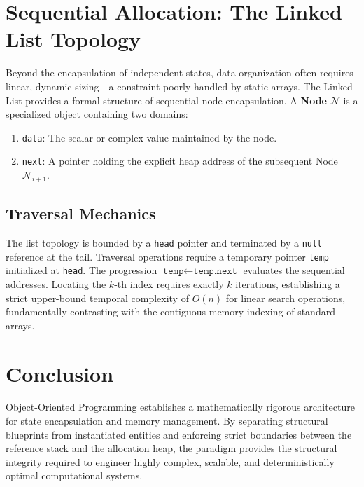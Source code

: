 \documentclass[10pt,journal,compsoc]{IEEEtran}
\begin{document}
\section{Sequential Allocation: The Linked List Topology}
Beyond the encapsulation of independent states, data organization often requires linear, dynamic sizing—a constraint poorly handled by static arrays. The Linked List provides a formal structure of sequential node encapsulation.
A \textbf{Node} $\mathcal{N}$ is a specialized object containing two domains:
\begin{enumerate}
\item \texttt{data}: The scalar or complex value maintained by the node.
\item \texttt{next}: A pointer holding the explicit heap address of the subsequent Node $\mathcal{N}_{i+1}$.
\end{enumerate}

\subsection{Traversal Mechanics}
The list topology is bounded by a \texttt{head} pointer and terminated by a \texttt{null} reference at the tail. Traversal operations require a temporary pointer \texttt{temp} initialized at \texttt{head}. The progression $\texttt{temp} \leftarrow \texttt{temp.next}$ evaluates the sequential addresses. Locating the $k$-th index requires exactly $k$ iterations, establishing a strict upper-bound temporal complexity of $O(n)$ for linear search operations, fundamentally contrasting with the contiguous memory indexing of standard arrays.

\section{Conclusion}
Object-Oriented Programming establishes a mathematically rigorous architecture for state encapsulation and memory management. By separating structural blueprints from instantiated entities and enforcing strict boundaries between the reference stack and the allocation heap, the paradigm provides the structural integrity required to engineer highly complex, scalable, and deterministically optimal computational systems.
\end{document}
